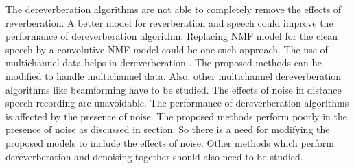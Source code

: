 The dereverberation algorithms are not able to completely remove the effects of reverberation. A better model for reverberation and speech could improve the performance of dereverberation algorithm. Replacing NMF model for the clean speech by a convolutive NMF model could be one such approach. The use of multichannel data helps in dereverberation \cite{naylor2010speech}. The proposed methods can be modified to handle multichannel data. Also, other multichannel dereverberation algorithms like beamforming have to be studied. The effects of noise in distance speech recording are unavoidable. The performance of dereverberation algorithms is affected by the presence of noise. The proposed methods perform poorly in the presence of noise as discussed in section. So there is a need for modifying the proposed models to include the effects of noise. Other methods which perform dereverberation and denoising together should also need to be studied.  

\fi